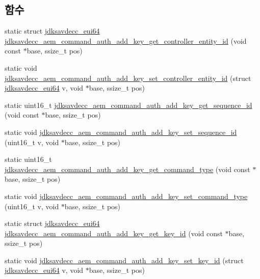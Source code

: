 \subsection*{함수}
\begin{DoxyCompactItemize}
\item 
static struct \hyperlink{structjdksavdecc__eui64}{jdksavdecc\+\_\+eui64} \hyperlink{group__command__auth__add__key_gab5910142f38f2ec6a213bfddf37c4075}{jdksavdecc\+\_\+aem\+\_\+command\+\_\+auth\+\_\+add\+\_\+key\+\_\+get\+\_\+controller\+\_\+entity\+\_\+id} (void const $\ast$base, ssize\+\_\+t pos)
\item 
static void \hyperlink{group__command__auth__add__key_gaf57051ceea4b07a5302d8b64f268c343}{jdksavdecc\+\_\+aem\+\_\+command\+\_\+auth\+\_\+add\+\_\+key\+\_\+set\+\_\+controller\+\_\+entity\+\_\+id} (struct \hyperlink{structjdksavdecc__eui64}{jdksavdecc\+\_\+eui64} v, void $\ast$base, ssize\+\_\+t pos)
\item 
static uint16\+\_\+t \hyperlink{group__command__auth__add__key_gadecf2a81d441dfccbfd242a73a0f36a3}{jdksavdecc\+\_\+aem\+\_\+command\+\_\+auth\+\_\+add\+\_\+key\+\_\+get\+\_\+sequence\+\_\+id} (void const $\ast$base, ssize\+\_\+t pos)
\item 
static void \hyperlink{group__command__auth__add__key_gaf66ab9e8cfd7da83cccdded2e3a187c3}{jdksavdecc\+\_\+aem\+\_\+command\+\_\+auth\+\_\+add\+\_\+key\+\_\+set\+\_\+sequence\+\_\+id} (uint16\+\_\+t v, void $\ast$base, ssize\+\_\+t pos)
\item 
static uint16\+\_\+t \hyperlink{group__command__auth__add__key_gae140a9e47f061225cffaeb8de7c659af}{jdksavdecc\+\_\+aem\+\_\+command\+\_\+auth\+\_\+add\+\_\+key\+\_\+get\+\_\+command\+\_\+type} (void const $\ast$base, ssize\+\_\+t pos)
\item 
static void \hyperlink{group__command__auth__add__key_ga7b3c8b15007a13aae6c22b552f72c2ee}{jdksavdecc\+\_\+aem\+\_\+command\+\_\+auth\+\_\+add\+\_\+key\+\_\+set\+\_\+command\+\_\+type} (uint16\+\_\+t v, void $\ast$base, ssize\+\_\+t pos)
\item 
static struct \hyperlink{structjdksavdecc__eui64}{jdksavdecc\+\_\+eui64} \hyperlink{group__command__auth__add__key_ga50b36df2bd6e8bd5c5ff9a077eae5280}{jdksavdecc\+\_\+aem\+\_\+command\+\_\+auth\+\_\+add\+\_\+key\+\_\+get\+\_\+key\+\_\+id} (void const $\ast$base, ssize\+\_\+t pos)
\item 
static void \hyperlink{group__command__auth__add__key_gabc1792a1db0b4473836c96d1971d3d6f}{jdksavdecc\+\_\+aem\+\_\+command\+\_\+auth\+\_\+add\+\_\+key\+\_\+set\+\_\+key\+\_\+id} (struct \hyperlink{structjdksavdecc__eui64}{jdksavdecc\+\_\+eui64} v, void $\ast$base, ssize\+\_\+t pos)

\end{DoxyCompactItemize}
